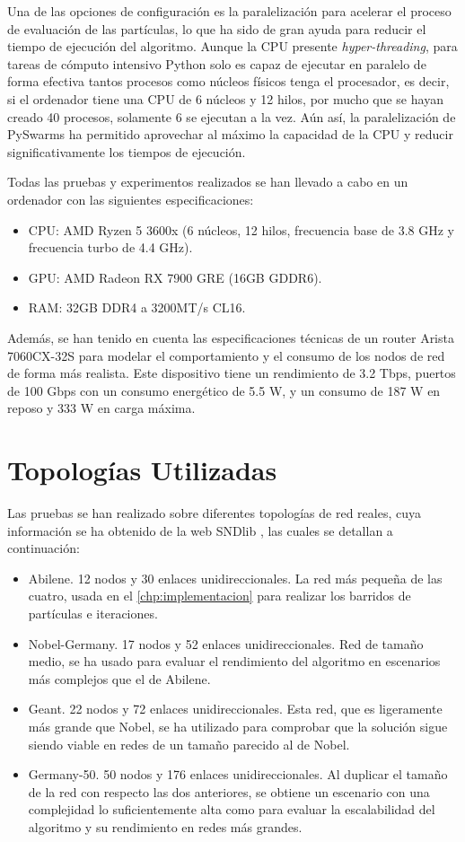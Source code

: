 Una de las opciones de configuración es la paralelización para acelerar el proceso de evaluación de las partículas, lo que ha sido de gran ayuda para reducir el tiempo de ejecución del algoritmo. Aunque la CPU presente \textit{hyper-threading}, para tareas de cómputo intensivo Python solo es capaz de ejecutar en paralelo de forma efectiva tantos procesos como núcleos físicos tenga el procesador, es decir, si el ordenador tiene una CPU de 6 núcleos y 12 hilos, por mucho que se hayan creado 40 procesos, solamente 6 se ejecutan a la vez. Aún así, la paralelización de PySwarms ha permitido aprovechar al máximo la capacidad de la CPU y reducir significativamente los tiempos de ejecución.

Todas las pruebas y experimentos realizados se han llevado a cabo en un ordenador con las siguientes especificaciones:
\begin{itemize}
    \item CPU: AMD Ryzen 5 3600x (6 núcleos, 12 hilos, frecuencia base de 3.8 GHz y frecuencia turbo de 4.4 GHz).
    \item GPU: AMD Radeon RX 7900 GRE (16GB GDDR6).
    \item RAM: 32GB DDR4 a 3200MT/s CL16.
\end{itemize}

Además, se han tenido en cuenta las especificaciones técnicas de un router Arista 7060CX-32S \cite{AristaNetworks2021} para modelar el comportamiento y el consumo de los nodos de red de forma más realista. Este dispositivo tiene un rendimiento de 3.2 Tbps, puertos de 100 Gbps con un consumo energético de 5.5 W, y un consumo de 187 W en reposo y 333 W en carga máxima.

\section{Topologías Utilizadas}

Las pruebas se han realizado sobre diferentes topologías de red reales, cuya información se ha obtenido de la web SNDlib \cite{Orlowski2010}, las cuales se detallan a continuación:

\begin{itemize}
    \item Abilene. 12 nodos y 30 enlaces unidireccionales. La red más pequeña de las cuatro, usada en el \autoref{chp:implementacion} para realizar los barridos de partículas e iteraciones.
    \item Nobel-Germany. 17 nodos y 52 enlaces unidireccionales. Red de tamaño medio, se ha usado para evaluar el rendimiento del algoritmo en escenarios más complejos que el de Abilene.
    \item Geant. 22 nodos y 72 enlaces unidireccionales. Esta red, que es ligeramente más grande que Nobel, se ha utilizado para comprobar que la solución sigue siendo viable en redes de un tamaño parecido al de Nobel.
    \item Germany-50. 50 nodos y 176 enlaces unidireccionales. Al duplicar el tamaño de la red con respecto las dos anteriores, se obtiene un escenario con una complejidad lo suficientemente alta como para evaluar la escalabilidad del algoritmo y su rendimiento en redes más grandes.
\end{itemize}

